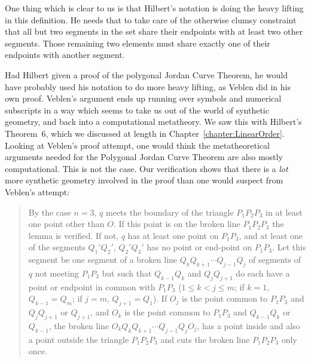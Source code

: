 One thing which is clear to us is that Hilbert's notation is doing the heavy lifting in this definition. He needs that to take care of the otherwise clumsy constraint that all but two segments in the set share their endpoints with at least two other segments. Those remaining two elements must share exactly one of their endpoints with another segment.

Had Hilbert given a proof of the polygonal Jordan Curve Theorem, he would have probably used his notation to do more heavy lifting, as Veblen did in his own proof. Veblen's argument ends up running over symbols and numerical subscripts in a way which seems to take us out of the world of synthetic geometry, and back into a computational metatheory. We saw this with Hilbert's Theorem~6, which we discussed at length in Chapter~\ref{chapter:LinearOrder}. Looking at Veblen's proof attempt, one would think the metatheoretical arguments needed for the Polygonal Jordan Curve Theorem are also mostly computational. This is not the case. Our verification shows that there is a \emph{lot} more synthetic geometry involved in the proof than one would suspect from Veblen's attempt:
\begin{quote}By the case $n=3$, $q$ meets the boundary of the triangle $P_1P_2P_3$ in at least one point other than $O$. If this point is on the broken line $P_1P_2P_3$ the lemma is verified. If not, $q$ has at least one point on $P_1P_3$, and at least one of the segments $Q_1'Q_2'$, $Q_2'Q_3'$ has no point or end-point on $P_1P_3$. Let this segment be one segment of a broken line $Q_kQ_{k+1}\cdots Q_{j-1}Q_j$ of segments of $q$ not meeting $P_1P_3$ but such that $Q_{k-1}Q_k$ and $Q_jQ_{j+1}$ do each have a point or endpoint in common with $P_1P_3$ ($1 \leq k < j \leq m$; if $k = 1$, $Q_{k-1} = Q_m$; if $j = m$, $Q_{j+1} = Q_1$). If $O_j$ is the point common to $P_1P_3$ and $Q_jQ_{j+1}$ or $Q_{j+1}$, and $O_k$ is the point common to $P_1P_3$ and $Q_{k-1}Q_k$ or $Q_{k-1}$, the broken line $O_kQ_kQ_{k+1}\cdots Q_{j-1}Q_jO_j$, has a point inside and also a point outside the triangle $P_1P_2P_3$ and cuts the broken line $P_1P_2P_3$ only once. \end{quote}



